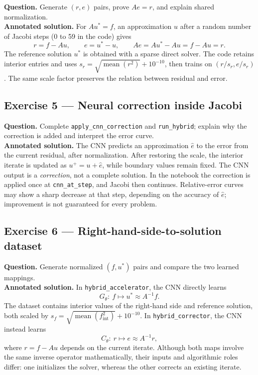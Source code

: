 \documentclass[11pt,a4paper]{article}
\begin{document}
\noindent \textbf{Question.} Generate $(r,e)$ pairs, prove $Ae=r$,
and explain shared normalization.
\\

\noindent \textbf{Annotated solution.} For $Au^*=f$, an approximation $u$
after a random number of Jacobi steps (0 to 59 in the code)
gives
\[
r=f-Au,\qquad e=u^*-u,\qquad
Ae=Au^*-Au=f-Au=r.
\]
The reference solution $u^*$ is obtained with a sparse
direct solver. The code retains interior entries and uses
$s_r=\sqrt{\operatorname{mean}(r^2)}+10^{-10}$,
then trains on $(r/s_r,e/s_r)$. The same scale factor
preserves the relation between residual and error.

\subsection{Exercise 5 --- Neural correction inside Jacobi}

\noindent \textbf{Question.} Complete \texttt{apply\_cnn\_correction}
and \texttt{run\_hybrid}; explain why the correction is added
and interpret the error curve.
\\

\noindent \textbf{Annotated solution.} The CNN predicts an approximation
$\widehat e$ to the error from the current residual, after
normalization. After restoring the scale, the interior
iterate is updated as $u^+=u+\widehat e$, while boundary
values remain fixed. The CNN output is a \emph{correction},
not a complete solution. In the notebook the correction
is applied once at \texttt{cnn\_at\_step}, and Jacobi then
continues. Relative-error curves may show a sharp decrease
at that step, depending on the accuracy of $\widehat e$;
improvement is not guaranteed for every problem.

\subsection{Exercise 6 --- Right-hand-side-to-solution dataset}

\noindent \textbf{Question.} Generate normalized $(f,u^*)$ pairs
and compare the two learned mappings.
\\

\noindent \textbf{Annotated solution.} In \texttt{hybrid\_accelerator},
the CNN directly learns
\[
G_\theta:\ f\longmapsto u^*\approx A^{-1}f.
\]
The dataset contains interior values of the right-hand side
and reference solution, both scaled by
$s_f=\sqrt{\operatorname{mean}(f_{\mathrm{int}}^2)}+10^{-10}$.
In \texttt{hybrid\_corrector}, the CNN instead learns
\[
C_\theta:\ r\longmapsto e\approx A^{-1}r,
\]
where $r=f-Au$ depends on the current iterate. Although
both maps involve the same inverse operator mathematically,
their inputs and algorithmic roles differ: one initializes
the solver, whereas the other corrects an existing iterate.
\end{document}
